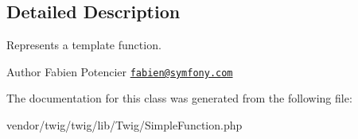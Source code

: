 \subsection{Detailed Description}
Represents a template function.

\begin{DoxyAuthor}{Author}
Fabien Potencier \href{mailto:fabien@symfony.com}{\tt fabien@symfony.\+com} 
\end{DoxyAuthor}


The documentation for this class was generated from the following file\+:\begin{DoxyCompactItemize}
\item 
vendor/twig/twig/lib/\+Twig/Simple\+Function.\+php\end{DoxyCompactItemize}
